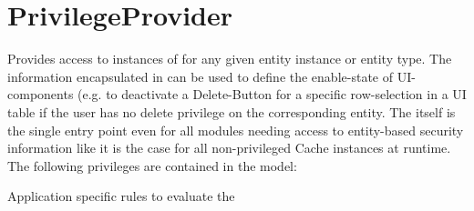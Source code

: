 \section{PrivilegeProvider}
\label{feature:PrivilegeProvider}
\ClearAPI
Provides access to instances of  for any given entity instance or entity type. The information encapsulated in  can be used to define the enable-state of UI-components (e.g. to deactivate a Delete-Button for a specific row-selection in a UI table if the user has no delete privilege on the corresponding entity. The  itself is the single entry point even for all \AMBETH{} modules needing access to entity-based security information like it is the case for all non-privileged Cache instances at runtime.\\

The following privileges are contained in the model:



Application specific rules to evaluate the
\TODO